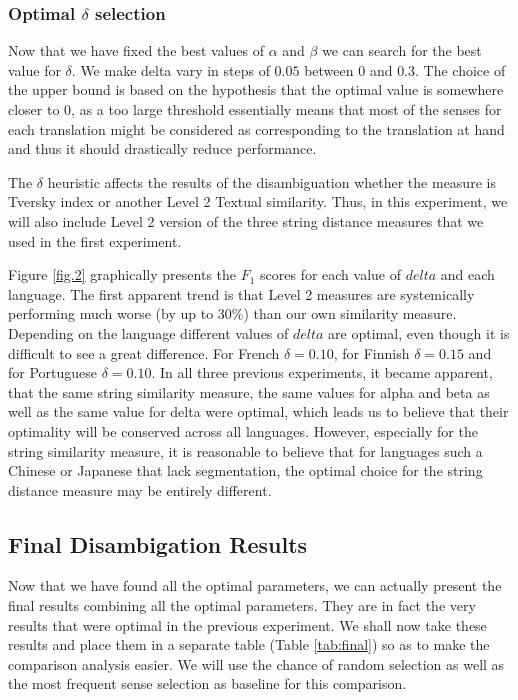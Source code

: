 \documentclass[10pt,a4paper,twoside]{article}
\begin{document}
\subsubsection{Optimal \(\delta\) selection}
Now that we have fixed the best values of \(\alpha\) and \(\beta\) we can search for the best value for \(\delta\). We make delta vary in steps of \(0.05\) between \(0\) and \(0.3\). The choice of the upper bound is based on the hypothesis that the optimal value is somewhere closer to 0, as a too large threshold essentially means that most of the senses for each translation might be considered as corresponding to the translation at hand and thus it should drastically reduce performance. 

The \(\delta\) heuristic affects the results of the disambiguation whether the measure is  Tversky index or another Level 2 Textual similarity. Thus, in this experiment, we will also include Level 2 version of the three string distance measures that we used in the first experiment.

Figure \ref{fig.2} graphically presents the \(F_1\) scores for each value of \(delta\) and each language. The first apparent trend is that Level 2 measures are systemically performing much worse (by up to 30\%) than our own similarity measure. Depending on the language different values of \(delta\) are optimal, even though it is difficult to see a great difference. For French \(\delta=0.10\), for Finnish \(\delta=0.15\)
 and for Portuguese \(\delta=0.10\). 
In all three previous experiments, it became apparent, that the same string similarity measure, the same values for alpha and beta as well as the same value for delta were optimal, which leads us to believe that their optimality will be conserved across all languages. However, especially for the string similarity measure, it is reasonable to believe that for languages such a Chinese or Japanese that lack segmentation, the optimal choice for the string distance measure may be entirely different.
\subsection{Final Disambigation Results}

Now that we have found all the optimal parameters, we can actually present the final results combining all the optimal parameters. They are in fact the very results that were optimal in the previous experiment. We shall now take these results and place them in a separate table (Table \ref{tab:final}) so as to make the comparison analysis easier. We will use the chance of random selection as well as the most frequent sense selection as baseline for this comparison.
\end{document}

